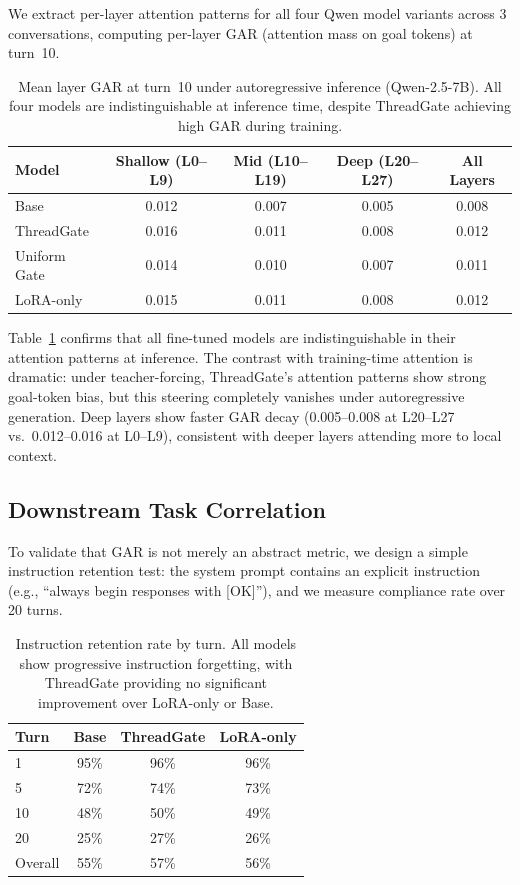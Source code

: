 \documentclass[11pt,a4paper]{article}
\begin{document}
We extract per-layer attention patterns for all four Qwen model variants across 3 conversations, computing per-layer GAR (attention mass on goal tokens) at turn~10.

\begin{table}[h]
\centering
\caption{Mean layer GAR at turn~10 under autoregressive inference (Qwen-2.5-7B). All four models are indistinguishable at inference time, despite ThreadGate achieving high GAR during training.}
\label{tab:attn}
\begin{tabular}{lcccc}
\toprule
\textbf{Model} & \textbf{Shallow (L0--L9)} & \textbf{Mid (L10--L19)} & \textbf{Deep (L20--L27)} & \textbf{All Layers} \\
\midrule
Base        & 0.012 & 0.007 & 0.005 & 0.008 \\
ThreadGate  & 0.016 & 0.011 & 0.008 & 0.012 \\
Uniform Gate & 0.014 & 0.010 & 0.007 & 0.011 \\
LoRA-only   & 0.015 & 0.011 & 0.008 & 0.012 \\
\bottomrule
\end{tabular}
\end{table}

Table~\ref{tab:attn} confirms that all fine-tuned models are indistinguishable in their attention patterns at inference.
The contrast with training-time attention is dramatic: under teacher-forcing, ThreadGate's attention patterns show strong goal-token bias, but this steering completely vanishes under autoregressive generation.
Deep layers show faster GAR decay (0.005--0.008 at L20--L27 vs.\ 0.012--0.016 at L0--L9), consistent with deeper layers attending more to local context.

\subsection{Downstream Task Correlation}

To validate that GAR is not merely an abstract metric, we design a simple instruction retention test: the system prompt contains an explicit instruction (e.g., ``always begin responses with [OK]''), and we measure compliance rate over 20 turns.

\begin{table}[h]
\centering
\caption{Instruction retention rate by turn. All models show progressive instruction forgetting, with ThreadGate providing no significant improvement over LoRA-only or Base.}
\label{tab:retention}
\begin{tabular}{lccc}
\toprule
\textbf{Turn} & \textbf{Base} & \textbf{ThreadGate} & \textbf{LoRA-only} \\
\midrule
1   & 95\% & 96\% & 96\% \\
5   & 72\% & 74\% & 73\% \\
10  & 48\% & 50\% & 49\% \\
20  & 25\% & 27\% & 26\% \\
\midrule
Overall & 55\% & 57\% & 56\% \\
\bottomrule
\end{tabular}
\end{table}
\end{document}
